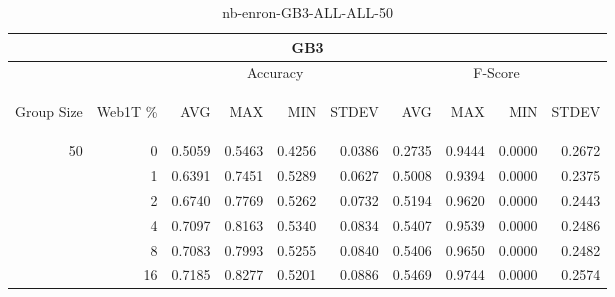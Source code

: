 \begin{center}
\begin{table}[htbp]
\begin{tabular}{ | r | r | r | r | r | r | r | r | r | r |}
\hline
\multicolumn{10}{|c|}{GB3}\\
\hline
 & & \multicolumn{4}{|c|}{Accuracy} & \multicolumn{4}{|c|}{F-Score}\\ \cline{3-10}
\begin{sideways}Group Size\end{sideways} & \begin{sideways}Web1T \%\end{sideways} & \begin{sideways}AVG\end{sideways} & \begin{sideways}MAX\end{sideways} & \begin{sideways}MIN\end{sideways} & \begin{sideways}STDEV\end{sideways} & \begin{sideways}AVG\end{sideways} & \begin{sideways}MAX\end{sideways} & \begin{sideways}MIN\end{sideways} & \begin{sideways}STDEV\end{sideways}\\
\hline
\multirow{6}{*}{50}
 & 0 & 0.5059 & 0.5463 & 0.4256 & 0.0386 & 0.2735 & 0.9444 & 0.0000 & 0.2672\\ \cline{2-10}
 & 1 & 0.6391 & 0.7451 & 0.5289 & 0.0627 & 0.5008 & 0.9394 & 0.0000 & 0.2375\\ \cline{2-10}
 & 2 & 0.6740 & 0.7769 & 0.5262 & 0.0732 & 0.5194 & 0.9620 & 0.0000 & 0.2443\\ \cline{2-10}
 & 4 & 0.7097 & 0.8163 & 0.5340 & 0.0834 & 0.5407 & 0.9539 & 0.0000 & 0.2486\\ \cline{2-10}
 & 8 & 0.7083 & 0.7993 & 0.5255 & 0.0840 & 0.5406 & 0.9650 & 0.0000 & 0.2482\\ \cline{2-10}
 & 16 & 0.7185 & 0.8277 & 0.5201 & 0.0886 & 0.5469 & 0.9744 & 0.0000 & 0.2574\\ \cline{2-10}
\hline
\end{tabular}
\caption{nb-enron-GB3-ALL-ALL-50}
\end{table}
\end{center}


